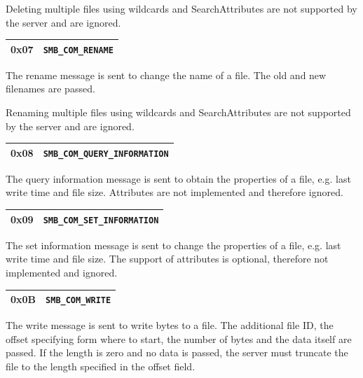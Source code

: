 \documentclass[11pt,a4paper]{book}
\begin{document}
Deleting multiple files using wildcards and SearchAttributes are not supported by the server and are ignored.

\begin{center}
\renewcommand{\tabcolsep}{5mm}
\begin{tabular}{p{3cm}p{8cm}}
0x07 & \texttt{SMB\_COM\_RENAME} \\
\hline
\end{tabular}
\end{center}
The rename message is sent to change the name of a file. The old and new filenames are passed.

Renaming multiple files using wildcards and SearchAttributes are not supported by the server and are ignored.

\begin{center}
\renewcommand{\tabcolsep}{5mm}
\begin{tabular}{p{3cm}p{8cm}}
0x08 & \texttt{SMB\_COM\_QUERY\_INFORMATION} \\
\hline
\end{tabular}
\end{center}
The query information message is sent to obtain the properties of a file, e.g. last write time and file size. Attributes are not implemented and therefore ignored.

\begin{center}
\renewcommand{\tabcolsep}{5mm}
\begin{tabular}{p{3cm}p{8cm}}
0x09 & \texttt{SMB\_COM\_SET\_INFORMATION} \\
\hline
\end{tabular}
\end{center}
The set information message is sent to change the properties of a file, e.g. last write time and file size. The support of attributes is optional, therefore not implemented and ignored.

\begin{center}
\renewcommand{\tabcolsep}{5mm}
\begin{tabular}{p{3cm}p{8cm}}
0x0B & \texttt{SMB\_COM\_WRITE} \\
\hline
\end{tabular}
\end{center}
The write message is sent to write bytes to a file. The additional file ID, the offset specifying form where to start, the number of bytes and the data itself are passed. If the length is zero and no data is passed, the server must truncate the file to the length specified in the offset field.
\end{document}
